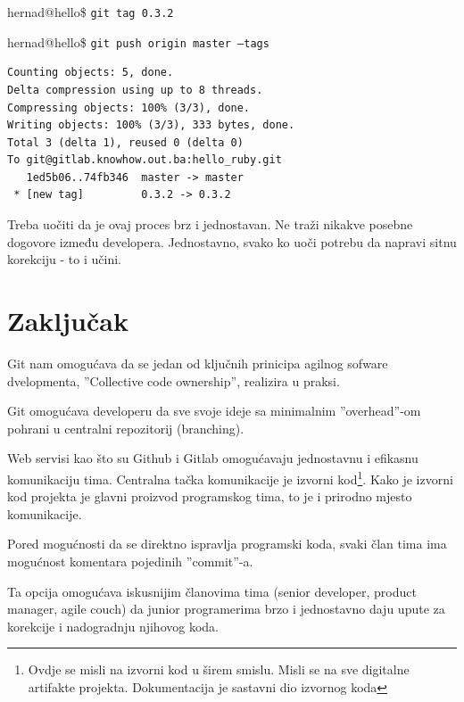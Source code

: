 \documentclass[times, utf8, seminar]{fit}
\begin{document}
hernad@hello\ruby\$ \texttt{git tag 0.3.2}

hernad@hello\ruby\$ \texttt{git push origin master --tags}
\begin{lstlisting}
Counting objects: 5, done.
Delta compression using up to 8 threads.
Compressing objects: 100% (3/3), done.
Writing objects: 100% (3/3), 333 bytes, done.
Total 3 (delta 1), reused 0 (delta 0)
To git@gitlab.knowhow.out.ba:hello_ruby.git
   1ed5b06..74fb346  master -> master
 * [new tag]         0.3.2 -> 0.3.2
\end{lstlisting}

Treba uočiti da je ovaj proces brz i jednostavan. Ne traži nikakve posebne dogovore između developera.
Jednostavno, svako ko uoči potrebu da napravi sitnu korekciju - to i učini.

\chapter{Zaključak}

Git nam omogućava da se jedan od ključnih prinicipa agilnog sofware dvelopmenta, ''Collective code ownership'', realizira u praksi.

Git omogućava developeru da sve svoje ideje sa minimalnim ''overhead''-om pohrani u centralni repozitorij (branching).

Web servisi kao što su Github i Gitlab omogućavaju jednostavnu i efikasnu komunikaciju tima. Centralna tačka komunikacije je izvorni kod\footnote{Ovdje se misli na izvorni kod u širem smislu. Misli se na sve digitalne artifakte projekta. Dokumentacija je sastavni dio izvornog koda}.
Kako je izvorni kod projekta je glavni proizvod programskog tima, to je i prirodno mjesto komunikacije.

Pored mogućnosti da se direktno ispravlja programski koda, svaki član tima ima mogućnost komentara pojedinih ''commit''-a.

Ta opcija omogućava iskusnijim članovima tima (senior developer, product manager, agile couch) da junior programerima brzo i jednostavno daju upute za korekcije i nadogradnju njihovog koda.







\appendix
\end{document}
